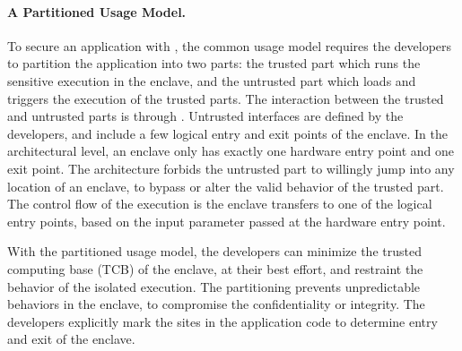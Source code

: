 \paragraph{A Partitioned Usage Model.}
To secure an application with \sgx{},
the common usage model requires the developers to partition the application into two parts:
the trusted part which runs the sensitive execution in the enclave,
and the untrusted part which loads and triggers the execution of the trusted parts.
The interaction between the trusted and untrusted parts is through .
Untrusted interfaces are defined by the developers, and include a few
logical entry and exit points of the enclave.
In the architectural level,
an enclave only has exactly one hardware entry point and one exit point.
The architecture forbids the untrusted part
to willingly jump into any location of an enclave,
to bypass or alter the valid behavior of the trusted part.
The control flow of the execution is the enclave transfers to one of the logical entry points,
based on the input parameter passed
at the hardware entry point.

With the partitioned usage model,
the developers can minimize the trusted computing base (TCB) of the enclave,
at their best effort,
and restraint the behavior of the isolated execution.
The partitioning prevents unpredictable behaviors in the enclave,
to compromise the confidentiality or integrity.
The developers explicitly mark the sites in the application code
to determine entry and exit of the enclave.



